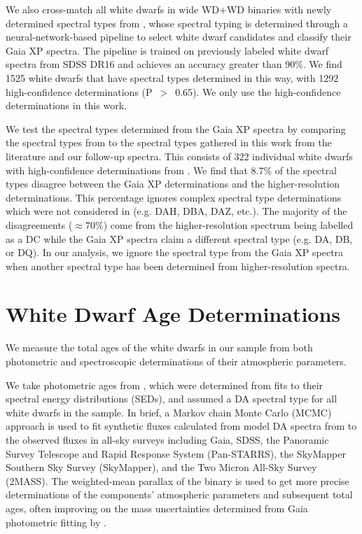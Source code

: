 \documentclass[twocolumn]{aastex631}
\begin{document}
We also cross-match all white dwarfs in wide WD+WD binaries with newly determined spectral types from \citet{2024A&A...682A...5V}, whose spectral typing is determined through a neural-network-based pipeline to select white dwarf candidates and classify their Gaia XP spectra. The pipeline is trained on previously labeled white dwarf spectra from SDSS DR16 \citep{2020ApJS..249....3A} and achieves an accuracy greater than 90\%. We find 1525 white dwarfs that have spectral types determined in this way, with 1292 high-confidence determinations (P~$>$~0.65). We only use the high-confidence determinations in this work.

We test the spectral types determined from the Gaia XP spectra by comparing the spectral types from \cite{2024A&A...682A...5V} to the spectral types gathered in this work from the literature and our follow-up spectra. This consists of 322 individual white dwarfs with high-confidence determinations from \cite{2024A&A...682A...5V}. We find that 8.7\% of the spectral types disagree between the Gaia XP determinations and the higher-resolution determinations. This percentage ignores complex spectral type determinations which were not considered in \cite{2024A&A...682A...5V} (e.g. DAH, DBA, DAZ, etc.). The majority of the disagreements ($\approx 70\%$) come from the higher-resolution spectrum being labelled as a DC while the Gaia XP spectra claim a different spectral type (e.g. DA, DB, or DQ). In our analysis, we ignore the spectral type from the Gaia XP spectra when another spectral type has been determined from higher-resolution spectra.

\section{White Dwarf Age Determinations}\label{sec:wd_ages}
We measure the total ages of the white dwarfs in our sample from both photometric and spectroscopic determinations of their atmospheric parameters. 

We take photometric ages from \citet{2022ApJ...934..148H}, which were determined from fits to their spectral energy distributions (SEDs), and assumed a DA spectral type for all white dwarfs in the sample. In brief, a Markov chain Monte Carlo (MCMC) approach is used to fit synthetic fluxes calculated from model DA spectra from \cite{2010MmSAI..81..921K} to the observed fluxes in all-sky surveys including Gaia, SDSS, the Panoramic Survey Telescope and Rapid Response System (Pan-STARRS), the SkyMapper Southern Sky Survey (SkyMapper), and the Two Micron All-Sky Survey (2MASS). The weighted-mean parallax of the binary is used to get more precise determinations of the components' atmospheric parameters and subsequent total ages, often improving on the mass uncertainties determined from Gaia photometric fitting by \citet{2021MNRAS.508.3877G}.
\end{document}
